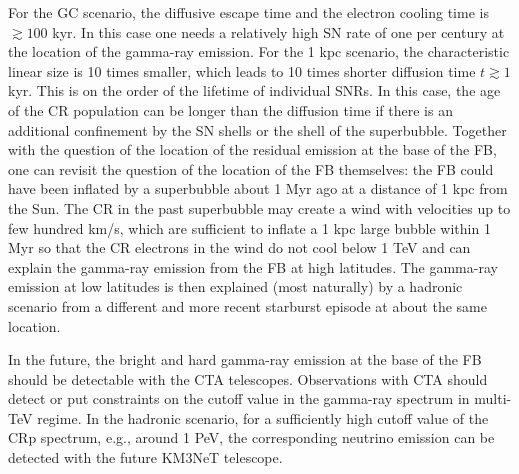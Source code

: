 For the GC scenario, the diffusive escape time and the electron cooling time is $\gtrsim 100$ kyr.
In this case one needs a relatively high SN rate of one per century at the location of the gamma-ray emission.
For the 1 kpc scenario, the characteristic linear size is 10 times smaller, which leads to 10 times shorter
diffusion time $t \gtrsim 1$ kyr. This is on the order of the lifetime of individual SNRs.
In this case, the age of the CR population can be longer than the diffusion time if there is an
additional confinement by the SN shells or the shell of the superbubble.
Together with the question of the location of the residual emission at the base of the FB,
one can revisit the question of the location of the FB themselves:
the FB could have been inflated by a superbubble about 1 Myr ago
at a distance of 1 kpc from the Sun.
The CR in the past superbubble may create a wind with velocities up to few hundred km/s, 
which are sufficient to inflate a 1 kpc large bubble within 1 Myr
so that the CR electrons in the wind do not cool below 1 TeV and can explain the
gamma-ray emission from the FB at high latitudes.
The gamma-ray emission at low latitudes is then explained (most naturally) by a hadronic
scenario from a different and more recent starburst episode at about the same location.

In the future, the bright and hard gamma-ray emission at the base of the FB
should be detectable with the CTA telescopes.
Observations with CTA should detect or put constraints on the cutoff value in the gamma-ray spectrum in multi-TeV regime.
In the hadronic scenario, for a sufficiently high cutoff value of the CRp spectrum, e.g., around 1 PeV,
the corresponding neutrino emission can be detected with the future KM3NeT telescope.






